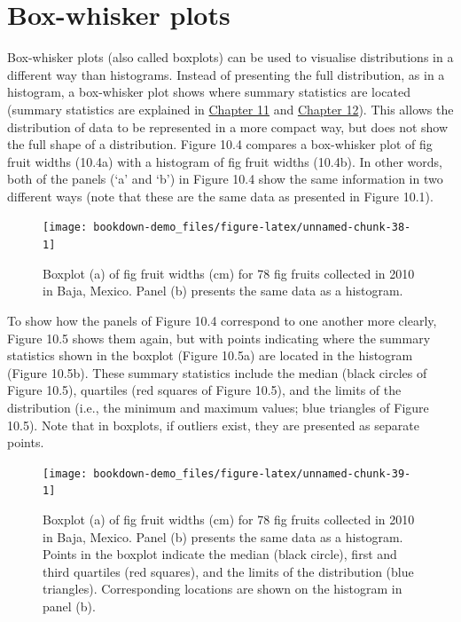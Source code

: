\documentclass[
]{scrbook}
\begin{document}
\hypertarget{box-whisker-plots}{%
\section{Box-whisker plots}\label{box-whisker-plots}}

Box-whisker plots (also called boxplots) can be used to visualise distributions in a different way than histograms.
Instead of presenting the full distribution, as in a histogram, a box-whisker plot shows where summary statistics are located (summary statistics are explained in \protect\hyperlink{Chapter_11}{Chapter 11} and \protect\hyperlink{Chapter_12}{Chapter 12}).
This allows the distribution of data to be represented in a more compact way, but does not show the full shape of a distribution.
Figure 10.4 compares a box-whisker plot of fig fruit widths (10.4a) with a histogram of fig fruit widths (10.4b).
In other words, both of the panels (`a' and `b') in Figure 10.4 show the same information in two different ways (note that these are the same data as presented in Figure 10.1).

\begin{figure}
\texttt{[image: bookdown-demo\_files/figure-latex/unnamed-chunk-38-1]} \caption{Boxplot (a) of fig fruit widths (cm) for 78 fig fruits collected in 2010 in Baja, Mexico. Panel (b) presents the same data as a histogram.}\label{fig:unnamed-chunk-38}
\end{figure}

To show how the panels of Figure 10.4 correspond to one another more clearly, Figure 10.5 shows them again, but with points indicating where the summary statistics shown in the boxplot (Figure 10.5a) are located in the histogram (Figure 10.5b).
These summary statistics include the median (black circles of Figure 10.5), quartiles (red squares of Figure 10.5), and the limits of the distribution (i.e., the minimum and maximum values; blue triangles of Figure 10.5).
Note that in boxplots, if outliers exist, they are presented as separate points.

\begin{figure}
\texttt{[image: bookdown-demo\_files/figure-latex/unnamed-chunk-39-1]} \caption{Boxplot (a) of fig fruit widths (cm) for 78 fig fruits collected in 2010 in Baja, Mexico. Panel (b) presents the same data as a histogram. Points in the boxplot indicate the median (black circle), first and third quartiles (red squares), and the limits of the distribution (blue triangles). Corresponding locations are shown on the histogram in panel (b).}\label{fig:unnamed-chunk-39}
\end{figure}
\end{document}
